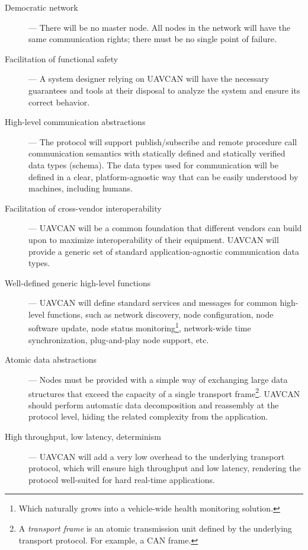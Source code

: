 \begin{description}
    \item[Democratic network] --- There will be no master node.
    All nodes in the network will have the same communication rights; there must be no single point of failure.

    \item[Facilitation of functional safety] --- A system designer relying on UAVCAN will have the necessary
    guarantees and tools at their disposal to analyze the system and ensure its correct behavior.

    \item[High-level communication abstractions] --- The protocol will support publish/subscribe and remote procedure
    call communication semantics with statically defined and statically verified data types (schema).
    The data types used for communication will be defined in a clear, platform-agnostic way
    that can be easily understood by machines, including humans.

    \item[Facilitation of cross-vendor interoperability] --- UAVCAN will be a common foundation that
    different vendors can build upon to maximize interoperability of their equipment.
    UAVCAN will provide a generic set of standard application-agnostic communication data types.

    \item[Well-defined generic high-level functions] --- UAVCAN will define standard services
    and messages for common high-level functions, such as network discovery, node configuration,
    node software update, node status monitoring\footnote{Which naturally grows into a vehicle-wide
    health monitoring solution.}, network-wide time synchronization, plug-and-play node support, etc.

    \item[Atomic data abstractions] --- Nodes must be provided with a simple way of exchanging large
    data structures that exceed the capacity of a single transport frame\footnote{A \emph{transport frame} is
    an atomic transmission unit defined by the underlying transport protocol. For example, a CAN frame.}.
    UAVCAN should perform automatic data decomposition and reassembly at the protocol level,
    hiding the related complexity from the application.

    \item[High throughput, low latency, determinism] --- UAVCAN will add a very low overhead to the underlying
    transport protocol, which will ensure high throughput and low latency, rendering the protocol well-suited
    for hard real-time applications.


\end{description}
